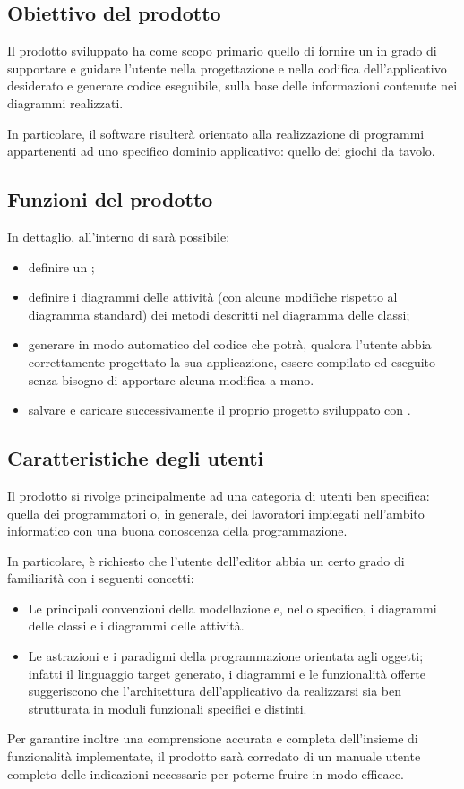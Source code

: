 \subsection{Obiettivo del prodotto}
Il prodotto sviluppato ha come scopo primario quello di fornire un  in grado di supportare e guidare l'utente nella progettazione e nella codifica dell'applicativo desiderato e generare codice eseguibile, sulla base delle informazioni contenute nei diagrammi realizzati.

In particolare, il software risulterà orientato alla realizzazione di programmi appartenenti ad uno specifico dominio applicativo: quello dei giochi da tavolo.

\subsection{Funzioni del prodotto}
In dettaglio, all'interno di \proj{} sarà possibile:
\begin{itemize}
	\item definire un ;
	\item definire i diagrammi delle attività (con alcune modifiche rispetto al diagramma standard) dei metodi descritti nel diagramma delle classi;
	\item generare in modo automatico del codice che potrà, qualora l'utente abbia correttamente progettato la sua applicazione, essere compilato ed eseguito senza bisogno di apportare alcuna modifica a mano.
	\item salvare e caricare successivamente il proprio progetto sviluppato con \proj.
\end{itemize}

\subsection{Caratteristiche degli utenti}
Il prodotto \proj{} si rivolge principalmente ad una categoria di utenti ben specifica: quella dei programmatori o, in generale, dei lavoratori impiegati nell'ambito informatico con una buona conoscenza della programmazione.

In particolare, è richiesto che l'utente dell'editor abbia un certo grado di familiarità con i seguenti concetti:
\begin{itemize}
	\item Le principali convenzioni della modellazione  e, nello specifico, i diagrammi delle classi e i diagrammi delle attività.
	\item Le astrazioni e i paradigmi della programmazione orientata agli oggetti; infatti il linguaggio target generato, i diagrammi e le funzionalità offerte suggeriscono che l'architettura dell'applicativo da realizzarsi sia ben strutturata in moduli funzionali specifici e distinti.
\end{itemize}
Per garantire inoltre una comprensione accurata e completa dell'insieme di funzionalità implementate, il prodotto sarà corredato di un manuale utente completo delle indicazioni necessarie per poterne fruire in modo efficace.

